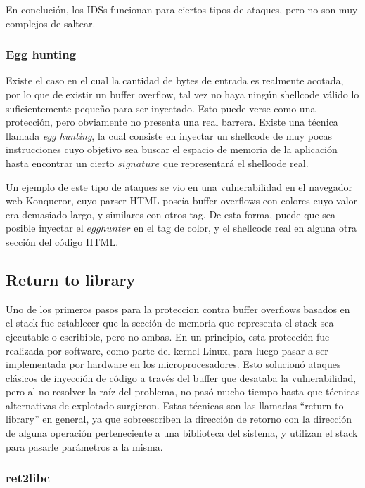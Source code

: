	En concluci\'on, los IDSs funcionan para ciertos tipos de ataques, pero no son muy complejos de saltear.

	\subsubsection{Egg hunting}
		\label{sec:egg_hunting}
	
	Existe el caso en el cual la cantidad de bytes de entrada es realmente acotada, por lo que de existir un buffer overflow, tal vez no haya ning\'un shellcode v\'alido lo suficientemente peque\~no para ser inyectado. Esto puede verse como una protecci\'on, pero obviamente no presenta una real barrera. Existe una t\'ecnica llamada {\em egg hunting}, la cual consiste en inyectar un shellcode de muy pocas instrucciones cuyo objetivo sea buscar el espacio de memoria de la aplicaci\'on hasta encontrar un cierto $signature$ que representar\'a el shellcode real.
	
	Un ejemplo de este tipo de ataques se vio en una vulnerabilidad en el navegador web Konqueror, cuyo parser HTML pose\'ia buffer overflows con colores cuyo valor era demasiado largo, y similares con otros tag. De esta forma, puede que sea posible inyectar el $egg hunter$ en el tag de color, y el shellcode real en alguna otra secci\'on del c\'odigo HTML.
	
	\subsection{Return to library}
		\label{sec:ret2lib}
	
	Uno de los primeros pasos para la proteccion contra buffer overflows basados en el stack fue establecer que la secci\'on de memoria que representa el stack sea ejecutable o escribible, pero no ambas. En un principio, esta protecci\'on fue realizada por software, como parte del kernel Linux, para luego pasar a ser implementada por hardware en los microprocesadores. Esto solucion\'o ataques cl\'asicos de inyecci\'on de c\'odigo a trav\'es del buffer que desataba la vulnerabilidad, pero al no resolver la ra\'iz del problema, no pas\'o mucho tiempo hasta que t\'ecnicas alternativas de explotado surgieron. Estas t\'ecnicas son las llamadas ``return to library'' en general, ya que sobreescriben la direcci\'on de retorno con la direcci\'on de alguna operaci\'on perteneciente a una biblioteca del sistema, y utilizan el stack para pasarle par\'ametros a la misma.
	
	\subsubsection{ret2libc}
		\label{sec:ret2libc}
	
